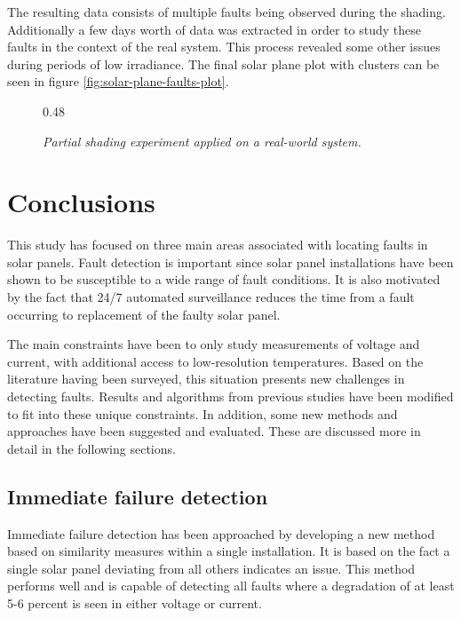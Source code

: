 The resulting data consists of multiple faults being observed during the shading.
Additionally a few days worth of data was extracted in order to study these faults in the context of the real system.
This process revealed some other issues during periods of low irradiance.
The final solar plane plot with clusters can be seen in figure \ref{fig:solar-plane-faults-plot}.

\begin{figure}[here]
\centering
{}
{0.48}
~
\caption[Partial shading experiment]{\emph{Partial shading experiment applied on a real-world system.}}
\end{figure}

\chapter{Conclusions}
This study has focused on three main areas associated with locating faults in solar panels.
Fault detection is important since solar panel installations have been shown to be susceptible to a wide range of fault conditions.
It is also motivated by the fact that 24/7 automated surveillance reduces the time from a fault occurring to replacement of the faulty solar panel.

The main constraints have been to only study measurements of voltage and current, with additional access to low-resolution temperatures.
Based on the literature having been surveyed, this situation presents new challenges in detecting faults.
Results and algorithms from previous studies have been modified to fit into these unique constraints.
In addition, some new methods and approaches have been suggested and evaluated.
These are discussed more in detail in the following sections.

\section{Immediate failure detection}
Immediate failure detection has been approached by developing a new method based on similarity measures within a single installation.
It is based on the fact a single solar panel deviating from all others indicates an issue.
This method performs well and is capable of detecting all faults where a degradation of at least 5-6 percent is seen in either voltage or current.

